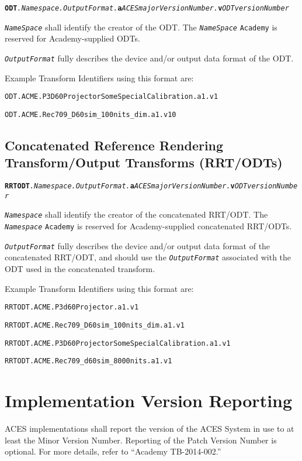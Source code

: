 \texttt{\textbf{ODT}\textit{.Namespace.OutputFormat.}\textbf{a}\textit{ACESmajorVersionNumber.}\textbf{v}\textit{ODTversionNumber}}

\texttt{\textit{NameSpace}} shall identify the creator of the ODT. The \texttt{\textit{NameSpace}} \texttt{Academy} is reserved for Academy-supplied ODTs. 

\texttt{\textit{OutputFormat}} fully describes the device and/or output data format of the ODT.

Example Transform Identifiers using this format are:
\begin{listize}
	\item \texttt{ODT.ACME.P3D60ProjectorSomeSpecialCalibration.a1.v1}
	\item \texttt{ODT.ACME.Rec709\_D60sim\_100nits\_dim.a1.v10}
\end{listize}

\subsection{Concatenated Reference Rendering Transform/Output Transforms (RRT/ODTs)} \label{sec:rrtodt}

\texttt{\textbf{RRTODT}\textit{.Namespace.OutputFormat.}\textbf{a}\textit{ACESmajorVersionNumber.}\textbf{v}\textit{ODTversionNumber}}

\texttt{\textit{Namespace}} shall identify the creator of the concatenated RRT/ODT. The \texttt{\textit{Namespace}} \texttt{Academy} is reserved for Academy-supplied concatenated RRT/ODTs.

\texttt{\textit{OutputFormat}} fully describes the device and/or output data format of the concatenated RRT/ODT, and should use the \texttt{\textit{OutputFormat}} associated with the ODT used in the concatenated transform. 

Example Transform Identifiers using this format are: 
\begin{listize}
	\item \texttt{RRTODT.ACME.P3d60Projector.a1.v1}
	\item \texttt{RRTODT.ACME.Rec709\_D60sim\_100nits\_dim.a1.v1}
	\item \texttt{RRTODT.ACME.P3D60ProjectorSomeSpecialCalibration.a1.v1}
	\item \texttt{RRTODT.ACME.Rec709\_d60sim\_8000nits.a1.v1}
\end{listize}

\section{Implementation Version Reporting}
ACES implementations shall report the version of the ACES System in use to at least the Minor Version Number.  Reporting of the Patch Version Number is optional. For more details, refer to ``Academy TB-2014-002.''

